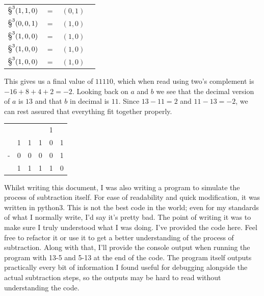 \documentclass[oneside]{book}
\begin{document}
\begin{center}
\begin{tabular}{l c c c }
$\hadd^3(1,1,0)$ & $=$ & $(0,1)$ \\
$\hadd^3(0,0,1)$ & $=$ & $(1,0)$ \\
$\hadd^3(1,0,0)$ & $=$ & $(1,0)$ \\
$\hadd^3(1,0,0)$ & $=$ & $(1,0)$ \\
$\hadd^3(1,0,0)$ & $=$ & $(1,0)$
\end{tabular}
\end{center}
\tab
This gives us a final value of $11110$, which when read using two's complement is $-16 + 8 +4 + 2 = -2$. Looking back on $a$ and $b$ we see that the decimal version of $a$ is $13$ and that $b$ in decimal is $11$. Since $13-11=2$ and $11-13=-2$, we can rest assured that everything fit together properly.
\begin{center}
\begin{tabular}{c c c c c c}
  &    &    &   & 1 &   \\
  & 1 & 1 & 1 & 0 & 1 \\
- & 0 & 0 & 0 & 0 & 1 \\
\hline
  & 1 & 1 & 1 & 1 & 0
\end{tabular}
\end{center}
\tab
Whilst writing this document, I was also writing a program to simulate the process of subtraction itself. For ease of readability and quick modification, it was written in python3. This is not the best code in the world; even for my standards of what I normally write, I'd say it's pretty bad. The point of writing it was to make sure I truly understood what I was doing. I've provided the code here. Feel free to refactor it or use it to get a better understanding of the process of subtraction. Along with that, I'll provide the console output when running the program with 13-5 and 5-13 at the end of the code. The program itself outputs practically every bit of information I found useful for debugging alongside the actual subtraction steps, so the outputs may be hard to read without understanding the code.
\newline
\end{document}
